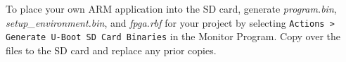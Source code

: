 \documentclass[11pt, twoside, pdftex]{article}
\begin{document}
To place your own ARM application into the SD card, generate \textit{program.bin}, \textit{setup\_environment.bin}, and \textit{fpga.rbf} for your project by selecting \texttt{Actions > Generate U-Boot SD Card Binaries} in the Monitor Program. Copy over the files to the SD card and replace any prior copies. 
 

\end{document}

